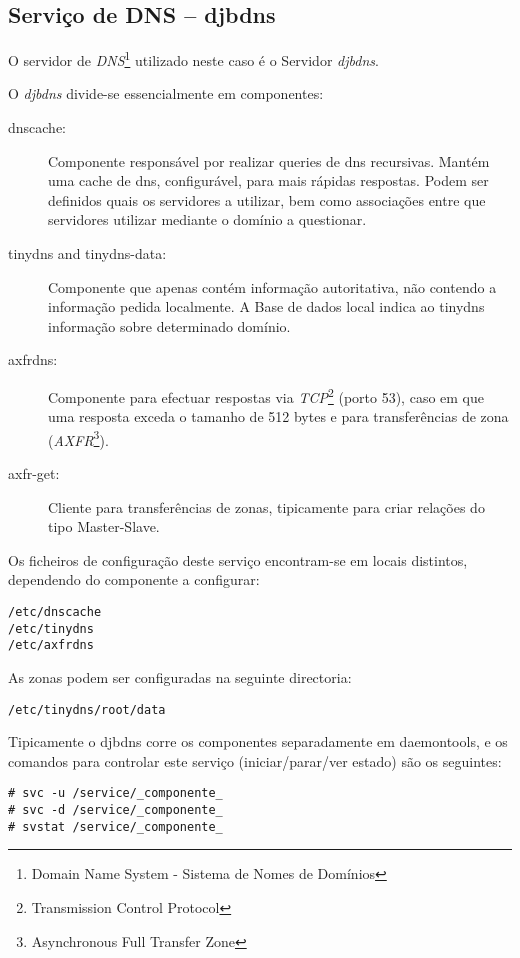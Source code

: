 \subsection{Serviço de DNS -- djbdns}

O servidor de \emph{DNS}\footnote{Domain Name System - Sistema de Nomes de Domínios} utilizado neste caso é o Servidor \emph{djbdns}.

O \emph{djbdns} divide-se essencialmente em componentes:
\begin{description}
	\item[dnscache:] Componente responsável por realizar queries de dns recursivas. Mantém uma cache de dns, configurável, para mais rápidas respostas. Podem ser definidos quais os servidores a utilizar, bem como associações entre que servidores utilizar mediante o domínio a questionar.
	\item[tinydns and tinydns-data:] Componente que apenas contém informação autoritativa, não contendo a informação pedida localmente. A Base de dados local indica ao tinydns informação sobre determinado domínio.
	\item[axfrdns:] Componente para efectuar respostas via \emph{TCP}\footnote{Transmission Control Protocol} (porto 53), caso em que uma resposta exceda o tamanho de 512 bytes e para transferências de zona (\emph{AXFR}\footnote{Asynchronous Full Transfer Zone}).
	\item[axfr-get:] Cliente para transferências de zonas, tipicamente para criar relações do tipo Master-Slave.
\end{description}

Os ficheiros de configuração deste serviço encontram-se em locais distintos, dependendo do componente a configurar:

\begin{Verbatim}[commandchars=\\\{\}]
/etc/dnscache
/etc/tinydns
/etc/axfrdns
\end{Verbatim}

As zonas podem ser configuradas na seguinte directoria:

\begin{Verbatim}[commandchars=\\\{\}]
/etc/tinydns/root/data
\end{Verbatim}

Tipicamente o djbdns corre os componentes separadamente em daemontools, e os comandos para controlar este serviço (iniciar/parar/ver estado) são os seguintes:

\begin{Verbatim}[commandchars=\\\{\}]
# svc -u /service/_componente_
# svc -d /service/_componente_
# svstat /service/_componente_
\end{Verbatim}


